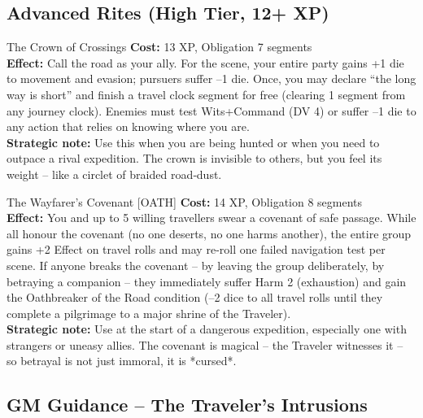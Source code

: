\documentclass[10pt,a5paper]{book}
\begin{document}
\subsection*{Advanced Rites (High Tier, 12+ XP)}

\begin{patronbox}{The Crown of Crossings}
\textbf{Cost:} 13 XP, Obligation 7 segments \\
\textbf{Effect:} Call the road as your ally. For the scene, your entire party gains +1 die to movement and evasion; pursuers suffer –1 die. Once, you may declare “the long way is short” and finish a travel clock segment for free (clearing 1 segment from any journey clock). Enemies must test Wits+Command (DV 4) or suffer –1 die to any action that relies on knowing where you are. \\
\textbf{Strategic note:} Use this when you are being hunted or when you need to outpace a rival expedition. The crown is invisible to others, but you feel its weight – like a circlet of braided road‑dust.
\end{patronbox}

\begin{patronbox}{The Wayfarer’s Covenant [OATH]}
\textbf{Cost:} 14 XP, Obligation 8 segments \\
\textbf{Effect:} You and up to 5 willing travellers swear a covenant of safe passage. While all honour the covenant (no one deserts, no one harms another), the entire group gains +2 Effect on travel rolls and may re‑roll one failed navigation test per scene. If anyone breaks the covenant – by leaving the group deliberately, by betraying a companion – they immediately suffer Harm 2 (exhaustion) and gain the Oathbreaker of the Road condition (–2 dice to all travel rolls until they complete a pilgrimage to a major shrine of the Traveler). \\
\textbf{Strategic note:} Use at the start of a dangerous expedition, especially one with strangers or uneasy allies. The covenant is magical – the Traveler witnesses it – so betrayal is not just immoral, it is *cursed*.
\end{patronbox}

\subsection*{GM Guidance – The Traveler’s Intrusions}
\end{document}
